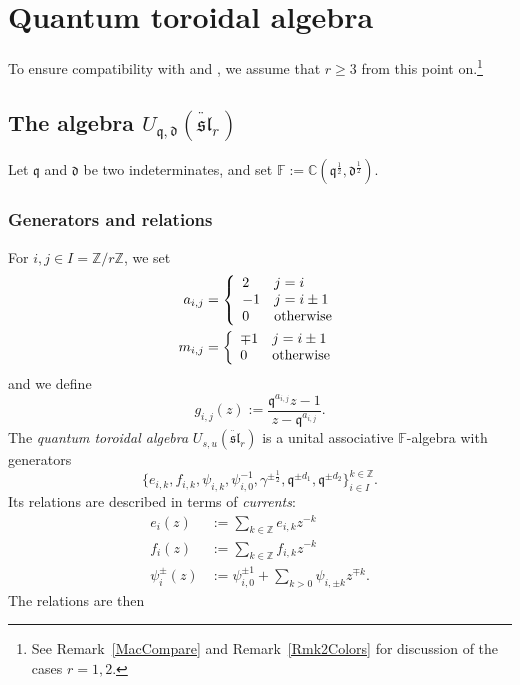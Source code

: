 \documentclass{amsart}
\newcommand{\Z}{\mathbb{Z}}
\newcommand{\C}{\mathbb{C}}
\newcommand{\F}{\mathbb{F}}
\newcommand{\qqq}{\mathfrak{q}}
\newcommand{\ddd}{\mathfrak{d}}
\theoremstyle{remark}
\numberwithin{thm}{section}
\numberwithin{equation}{section}
\begin{document}
\section{Quantum toroidal algebra}\label{Toroidal}

To ensure compatibility with \cite{Wen} and \cite{T}, we assume that $r\ge 3$ from this point on.\footnote{See Remark~\ref{MacCompare} and Remark~\ref{Rmk2Colors} for discussion of the cases $r=1,2$.}

\subsection{The algebra $U_{\qqq,\ddd}(\ddot{\mathfrak{sl}}_r)$}
Let $\qqq$ and $\ddd$ be two indeterminates, and set $\F:=\C(\qqq^{\frac{1}{2}},\ddd^{\frac{1}{2}})$.

\subsubsection{Generators and relations}\label{TorDef}
For $i,j\in I=\Z/r\Z$, we set
\begin{align*}
    a_{i,j}&=\left\{
\begin{array}{ll}
    2 & j=i \\
    -1 & j=i\pm 1\\
    0 & \hbox{otherwise}
\end{array}
\right.\\
m_{i,j}&=\left\{
\begin{array}{ll}
    \mp 1 & j=i\pm 1\\
    0 & \hbox{otherwise}
\end{array}
\right.
\end{align*}
and we define
\[
g_{i,j}(z):=\frac{\qqq^{a_{i,j}}z-1}{z-\qqq^{a_{i,j}}}.
\]
The \textit{quantum toroidal algebra} $U_{s,u}(\ddot{\mathfrak{sl}}_r)$ is a unital associative $\F$-algebra with generators
\[
\{e_{i,k},f_{i,k},\psi_{i,k},\psi_{i,0}^{-1},\gamma^{\pm\frac{1}{2}}, \qqq^{\pm d_1},\qqq^{\pm d_2}\}_{i\in I}^{k\in\Z}.
\]
Its relations are described in terms of \textit{currents}:
\begin{align*}
    e_i(z)&:=\sum_{k\in\Z}e_{i,k}z^{-k}\\
    f_i(z)&:=\sum_{k\in\Z}f_{i,k}z^{-k}\\
    \psi_i^\pm(z)&:=\psi_{i,0}^{\pm 1}+\sum_{k>0}\psi_{i,\pm k}z^{\mp k}.
\end{align*}
The relations are then
\end{document}
